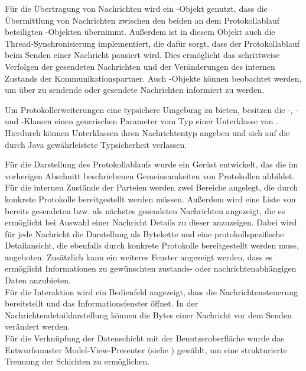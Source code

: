 Für die Übertragung von Nachrichten wird ein -Objekt genutzt, dass die Übermittlung von Nachrichten zwischen den beiden an dem Protokollablauf beteiligten -Objekten übernimmt. Außerdem ist in diesem Objekt auch die Thread-Synchronisierung implementiert, die dafür sorgt, dass der Protokollablauf beim Senden einer Nachricht pausiert wird. Dies ermöglicht das schrittweise Verfolgen der gesendeten Nachrichten und der Veränderungen des internen Zustands der Kommunikationspartner. Auch -Objekte können beobachtet werden, um über zu sendende oder gesendete Nachrichten informiert zu werden.

Um Protokollerweiterungen eine typsichere Umgebung zu bieten, besitzen die -, - und -Klassen einen generischen Parameter vom Typ einer Unterklasse von . Hierdurch können Unterklassen ihren Nachrichtentyp angeben und sich auf die durch Java gewährleistete Typsicherheit verlassen.


Für die Darstellung des Protokollablaufs wurde ein Gerüst entwickelt, das die im vorherigen Abschnitt beschriebenen Gemeinsamkeiten von Protokollen abbildet. Für die internen Zustände der Parteien werden zwei Bereiche angelegt, die durch konkrete Protokolle bereitgestellt werden müssen. Außerdem wird eine Liste von bereits gesendeten bzw. als nächstes gesendeten Nachrichten angezeigt, die es ermöglicht bei Auswahl einer Nachricht Details zu dieser anzuzeigen. Dabei wird für jede Nachricht die Darstellung als Bytekette und eine protokollspezifische Detailansicht, die ebenfalls durch konkrete Protokolle bereitgestellt werden muss, angeboten. Zusätzlich kann ein weiteres Fenster angezeigt werden, dass es ermöglicht Informationen zu gewünschten zustands- oder nachrichtenabhängigen Daten anzubieten.\\
Für die Interaktion wird ein Bedienfeld angezeigt, dass die Nachrichtensteuerung bereitstellt und das Informationsfenster öffnet. In der Nachrichtendetaildarstellung können die Bytes einer Nachricht vor dem Senden verändert werden.\\
Für die Verknüpfung der Datenschicht mit der Benutzeroberfläche wurde das Entwurfsmuster Model-View-Presenter (siehe \cite{potel96}) gewählt, um eine strukturierte Trennung der Schichten zu ermöglichen.

